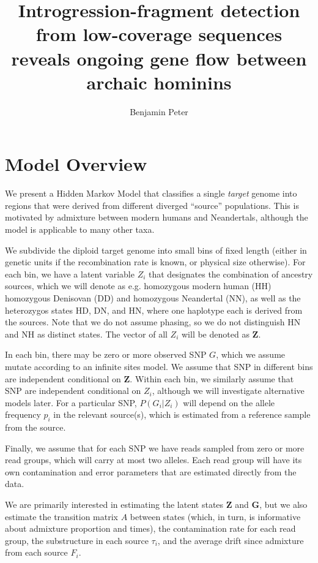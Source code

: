 \documentclass[10pt,a4paper]{article}
\author{Benjamin Peter}
\title{Introgression-fragment detection from low-coverage sequences reveals ongoing gene flow between archaic hominins}
\newcommand{\BFZ}{\mathbf{Z}}
\newcommand{\BFG}{\mathbf{G}}
\begin{document}
	\maketitle
\section*{Model Overview}

	We present a Hidden Markov Model that classifies a single \emph{target} genome into regions that were derived from different diverged ``source'' populations. This is motivated by admixture between modern humans and Neandertals, although the model is applicable to many other taxa. 
	
	We subdivide the diploid target genome into small bins of fixed length (either in genetic units if the recombination rate is known, or physical size otherwise). For each bin, we have a latent variable $Z_i$ that designates the combination of ancestry sources, which we will denote as e.g. homozygous modern human (HH) homozygous Denisovan (DD) and homozygous Neandertal (NN), as well as the heterozygos states HD, DN, and HN, where one haplotype each is derived from the sources. Note that we do not assume phasing, so we do not distinguish HN and NH as distinct states. The vector of all $Z_i$ will be denoted as $\BFZ$.
	
	In each bin, there may be zero or more observed SNP $G$, which we assume mutate according to an infinite sites model. We assume that SNP in different bins are independent conditional on $\BFZ$. Within each bin, we similarly assume that SNP are independent conditional on $Z_i$, although we will investigate alternative models later. For a particular SNP, $P(G_i | Z_i)$ will depend on the allele frequency $p_i$ in the relevant source(s), which is estimated from a reference sample from the source.
	
	Finally, we assume that for each SNP we have reads sampled from zero or more read groups, which will carry at most two alleles. Each read group will have its own contamination and error parameters that are estimated directly from the data.
	
	We are primarily interested in estimating the latent states $\BFZ$ and $\BFG$, but we also estimate the transition matrix $A$ between states (which, in turn, is informative about admixture proportion and times), the contamination rate for each read group, the substructure in each source $\tau_i$, and the average drift since admixture from each source $F_i$. 
\end{document}

